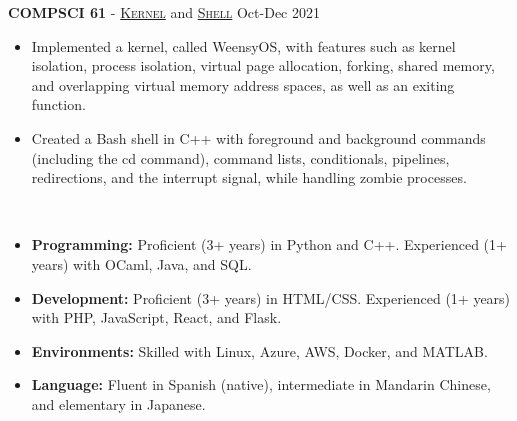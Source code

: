 \documentclass[11pt]{article}
\begin{document}
    \noindent \textbf{COMPSCI 61} - 
      \href{https://cs61.seas.harvard.edu/site/2021/WeensyOS/}{\textsc{Kernel}} and 
      \href{https://cs61.seas.harvard.edu/site/2021/Shell/}{\textsc{Shell}} \hfill Oct-Dec 2021
    \begin{itemize}[itemsep=-.4em, leftmargin=1em]\vspace{-2mm}
      \item Implemented a kernel, called WeensyOS, with features such as kernel isolation, process isolation, virtual page allocation, forking, shared memory, and overlapping virtual memory address spaces, as well as an exiting function.
      \item Created a Bash shell in C++ with foreground and background commands (including the cd command), command lists, conditionals, pipelines, redirections, and the interrupt signal, while handling zombie processes.
    \end{itemize}

   \vspace{-7pt}\\
   \noindent\makebox[\linewidth]{\rule{7.5in}{0.3pt}}
   \begin{itemize}[itemsep=-.4em, leftmargin=1em]\vspace{-2mm}
     \item \textbf{Programming:} Proficient (3+ years) in Python and C++. Experienced (1+ years) with OCaml, Java, and SQL.
     \item \textbf{Development:} Proficient (3+ years) in HTML/CSS. Experienced (1+ years) with PHP, JavaScript, React, and Flask.
     \item \textbf{Environments:} Skilled with Linux, Azure, AWS, Docker, and MATLAB.
     \item \textbf{Language:} 
       Fluent in Spanish (native), intermediate in Mandarin Chinese, and elementary in Japanese.
   \end{itemize}
\end{document}
